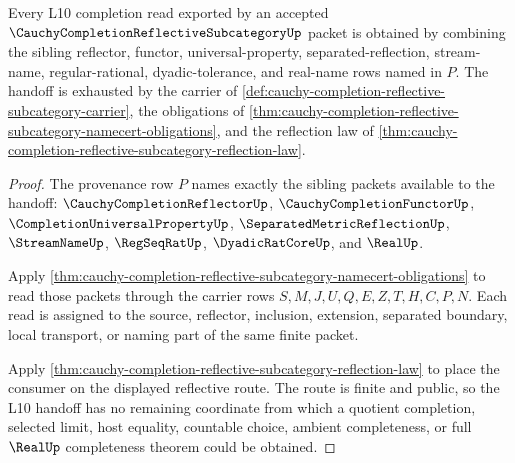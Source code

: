 \begin{theorem}
\label{thm:cauchy-completion-reflective-subcategory-l10-handoff}
Every L10 completion read exported by an accepted $\CauchyCompletionReflectiveSubcategoryUp$ packet is obtained by combining the sibling reflector, functor, universal-property, separated-reflection, stream-name, regular-rational, dyadic-tolerance, and real-name rows named in $P$. The handoff is exhausted by the carrier of \autoref{def:cauchy-completion-reflective-subcategory-carrier}, the obligations of \autoref{thm:cauchy-completion-reflective-subcategory-namecert-obligations}, and the reflection law of \autoref{thm:cauchy-completion-reflective-subcategory-reflection-law}.
\end{theorem}
\begin{proof}
The provenance row $P$ names exactly the sibling packets available to the handoff: $\CauchyCompletionReflectorUp$, $\CauchyCompletionFunctorUp$, $\CompletionUniversalPropertyUp$, $\SeparatedMetricReflectionUp$, $\StreamNameUp$, $\RegSeqRatUp$, $\DyadicRatCoreUp$, and $\RealUp$.

Apply \autoref{thm:cauchy-completion-reflective-subcategory-namecert-obligations} to read those packets through the carrier rows $S,M,J,U,Q,E,Z,T,H,C,P,N$. Each read is assigned to the source, reflector, inclusion, extension, separated boundary, local transport, or naming part of the same finite packet.

Apply \autoref{thm:cauchy-completion-reflective-subcategory-reflection-law} to place the consumer on the displayed reflective route. The route is finite and public, so the L10 handoff has no remaining coordinate from which a quotient completion, selected limit, host equality, countable choice, ambient completeness, or full $\RealUp$ completeness theorem could be obtained.
\end{proof}

